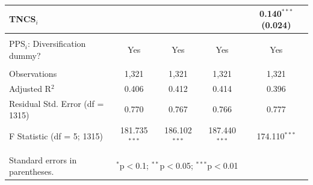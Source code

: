 \documentclass[draft,final]{vutinfth} %
\begin{document}
\begin{table}[!htbp]
\begin{tabularx}{\textwidth}{@{\extracolsep{\fill}}lcccc}
  TNCS$_{i}$ &  &  &  & 0.140$^{***}$ (0.024) \\ 
 \hline \\[-1.8ex] 
PPS$_{i}$: Diversification dummy? & Yes & Yes & Yes & Yes \\ 
\hline \\[-1.8ex] 
Observations & 1,321 & 1,321 & 1,321 & 1,321 \\ 
Adjusted R$^{2}$ & 0.406 & 0.412 & 0.414 & 0.396 \\ 
Residual Std. Error (df = 1315) & 0.770 & 0.767 & 0.766 & 0.777 \\ 
F Statistic (df = 5; 1315) & 181.735$^{***}$ & 186.102$^{***}$ & 187.440$^{***}$ & 174.110$^{***}$ \\ 
\hline 
\hline \\[-1.8ex] 
Standard errors in parentheses. & \multicolumn{4}{l}{$^{*}$p$<$0.1; $^{**}$p$<$0.05; $^{***}$p$<$0.01} \\ 
\end{tabularx} 
\end{table} 
\end{document}
